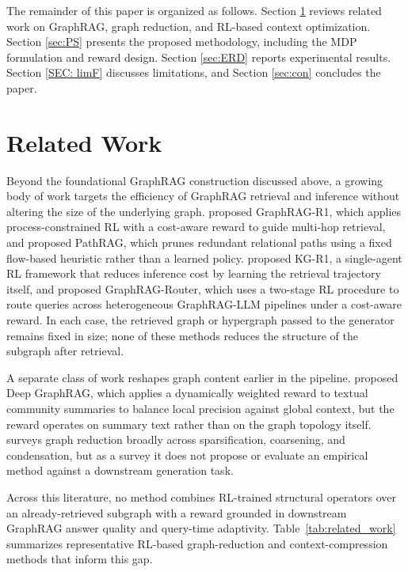 \documentclass[conference]{IEEEtran}
\begin{document}
The remainder of this paper is organized as follows. Section \ref{sec:RW} reviews related work on GraphRAG, graph reduction, and RL-based context optimization. Section \ref{sec:PS} presents the proposed methodology, including the MDP formulation and reward design. Section \ref{sec:ERD} reports experimental results. Section \ref{SEC: limF} discusses limitations, and Section \ref{sec:con} concludes the paper.



\section{Related Work}
\label{sec:RW}

Beyond the foundational GraphRAG construction discussed above, a growing body of work targets the efficiency of GraphRAG retrieval and inference without altering the size of the underlying graph. \citet{yu2026graphragr1} proposed GraphRAG-R1, which applies process-constrained RL with a cost-aware reward to guide multi-hop retrieval, and \citet{chen2026pathrag} proposed PathRAG, which prunes redundant relational paths using a fixed flow-based heuristic rather than a learned policy. \citet{song2026kgr1} proposed KG-R1, a single-agent RL framework that reduces inference cost by learning the retrieval trajectory itself, and \citet{fan2026graphragrouter} proposed GraphRAG-Router, which uses a two-stage RL procedure to route queries across heterogeneous GraphRAG-LLM pipelines under a cost-aware reward. In each case, the retrieved graph or hypergraph passed to the generator remains fixed in size; none of these methods reduces the structure of the subgraph after retrieval.

A separate class of work reshapes graph content earlier in the pipeline. \citet{li2026deepgraphrag} proposed Deep GraphRAG, which applies a dynamically weighted reward to textual community summaries to balance local precision against global context, but the reward operates on summary text rather than on the graph topology itself. \citet{hashemi2024comprehensive} surveys graph reduction broadly across sparsification, coarsening, and condensation, but as a survey it does not propose or evaluate an empirical method against a downstream generation task.

Across this literature, no method combines RL-trained structural operators over an already-retrieved subgraph with a reward grounded in downstream GraphRAG answer quality and query-time adaptivity. Table~\ref{tab:related_work} summarizes representative RL-based graph-reduction and context-compression methods that inform this gap.
\end{document}
